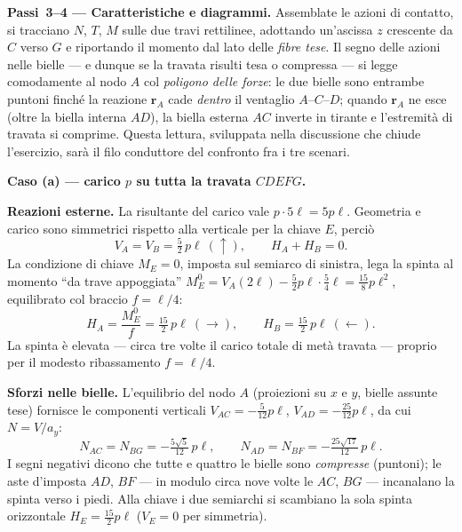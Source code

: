 \begin{esercizio}
\begin{svolgimento}
	
	\medskip\noindent\textbf{Passi~3--4 --- Caratteristiche e diagrammi.}
	Assemblate le azioni di contatto, si tracciano $N$, $T$, $M$ sulle due
	travi rettilinee, adottando un'ascissa $z$ crescente da $C$ verso $G$ e
	riportando il momento dal lato delle \emph{fibre tese}. Il segno delle
	azioni nelle bielle --- e dunque se la travata risulti tesa o compressa
	--- si legge comodamente al nodo $A$ col \emph{poligono delle forze}: le
	due bielle sono entrambe puntoni finché la reazione $\mathbf r_A$ cade
	\emph{dentro} il ventaglio $A$--$C$--$D$; quando $\mathbf r_A$ ne esce
	(oltre la biella interna $AD$), la biella esterna $AC$ inverte in tirante
	e l'estremità di travata si comprime. Questa lettura, sviluppata nella
	discussione che chiude l'esercizio, sarà il filo conduttore del confronto
	fra i tre scenari.
	
	
	
	\medskip\noindent\textbf{Caso (a) --- carico $p$ su tutta la travata $CDEFG$.}
	\nopagebreak
	
	\medskip\noindent\textbf{Reazioni esterne.}
	La risultante del carico vale $p\cdot 5\ell = 5p\ell$. Geometria e carico
	sono simmetrici rispetto alla verticale per la chiave $E$, perciò
	\[
	V_A=V_B=\tfrac{5}{2}\,p\ell\ (\uparrow),\qquad H_A+H_B=0.
	\]
	La condizione di chiave $M_E=0$, imposta sul semiarco di sinistra, lega la
	spinta al momento ``da trave appoggiata''
	$M_E^{0}=V_A(2\ell)-\tfrac{5}{2}p\ell\cdot\tfrac{5}{4}\ell=\tfrac{15}{8}p\ell^2$,
	equilibrato col braccio $f=\ell/4$:
	\[
	H_A=\frac{M_E^{0}}{f}=\tfrac{15}{2}\,p\ell\ (\rightarrow),\qquad
	H_B=\tfrac{15}{2}\,p\ell\ (\leftarrow).
	\]
	La spinta è elevata --- circa tre volte il carico totale di metà travata
	--- proprio per il modesto ribassamento $f=\ell/4$.
	
	\medskip\noindent\textbf{Sforzi nelle bielle.}
	L'equilibrio del nodo $A$ (proiezioni su $x$ e $y$, bielle assunte tese)
	fornisce le componenti verticali $V_{AC}=-\tfrac{5}{12}p\ell$,
	$V_{AD}=-\tfrac{25}{12}p\ell$, da cui $N=V/a_y$:
	\[
	N_{AC}=N_{BG}=-\tfrac{5\sqrt5}{12}\,p\ell,\qquad
	N_{AD}=N_{BF}=-\tfrac{25\sqrt{17}}{12}\,p\ell .
	\]
	I segni negativi dicono che tutte e quattro le bielle sono \emph{compresse}
	(puntoni); le aste d'imposta $AD$, $BF$ --- in modulo circa nove volte le
	$AC$, $BG$ --- incanalano la spinta verso i piedi. Alla chiave i due
	semiarchi si scambiano la sola spinta orizzontale $H_E=\tfrac{15}{2}p\ell$
	($V_E=0$ per simmetria).
	

\end{svolgimento}
\end{esercizio}
